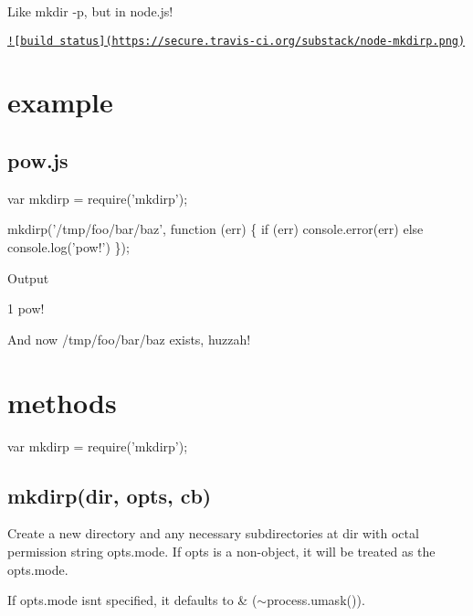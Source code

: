 Like {\ttfamily mkdir -\/p}, but in node.\+js!

\href{http://travis-ci.org/substack/node-mkdirp}{\tt !\mbox{[}build status\mbox{]}(https\+://secure.\+travis-\/ci.\+org/substack/node-\/mkdirp.\+png)}

\section*{example}

\subsection*{pow.\+js}


\begin{DoxyCode}
var mkdirp = require(\textcolor{stringliteral}{'mkdirp'});

mkdirp(\textcolor{stringliteral}{'/tmp/foo/bar/baz'}, \textcolor{keyword}{function} (err) \{
    \textcolor{keywordflow}{if} (err) console.error(err)
    \textcolor{keywordflow}{else} console.log(\textcolor{stringliteral}{'pow!'})
\});
\end{DoxyCode}


Output


\begin{DoxyCode}
1 pow!
\end{DoxyCode}


And now /tmp/foo/bar/baz exists, huzzah!

\section*{methods}


\begin{DoxyCode}
var mkdirp = require(\textcolor{stringliteral}{'mkdirp'});
\end{DoxyCode}


\subsection*{mkdirp(dir, opts, cb)}

Create a new directory and any necessary subdirectories at {\ttfamily dir} with octal permission string {\ttfamily opts.\+mode}. If {\ttfamily opts} is a non-\/object, it will be treated as the {\ttfamily opts.\+mode}.

If {\ttfamily opts.\+mode} isn\textquotesingle{}t specified, it defaults to { \& ($\sim$process.umask())}.

